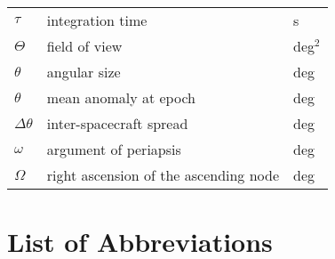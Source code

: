 \begin{table}[h!]
\begin{tabular}{l|l|l}
$\tau$             & integration time                         & s             \\
$\Theta$           & field of view                            & deg$^2$          \\
$\theta$           & angular size                             & deg           \\
$\theta$           & mean anomaly at epoch                    & deg           \\
$\Delta \theta$     & inter-spacecraft spread                  & deg           \\
$\omega$           & argument of periapsis                    & deg           \\
$\Omega$           & right ascension of the ascending node    & deg          
\end{tabular}
\end{table}

\chapter*{List of Abbreviations}

